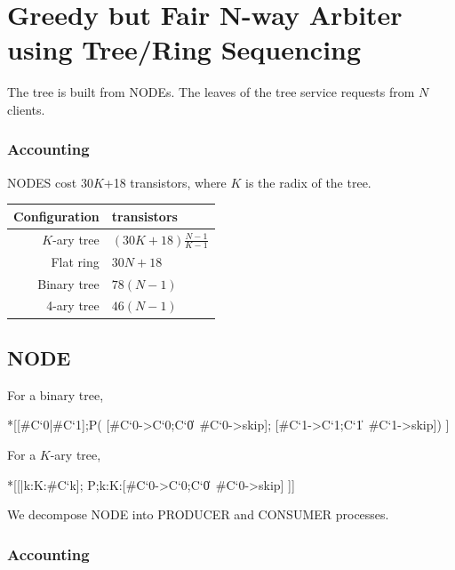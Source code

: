 \documentclass[aer.tex]{subfiles}
\begin{document}
\section{Greedy but Fair N-way Arbiter using Tree/Ring Sequencing}

The tree is built from NODEs. 
The leaves of the tree service requests from $N$ clients.

\subsubsection*{Accounting}

NODES cost 30$K$+18 transistors, where $K$ is the radix of the tree.

\begin{center}
    \begin{tabular}{|r|l|}
    \hline
    Configuration & transistors \\ \hline
    $K$-ary tree & $(30K+18)\frac{N-1}{K-1}$ \\ \hline
    Flat ring & $30N+18$ \\ \hline
    Binary tree & $78(N-1)$ \\ \hline
    4-ary tree & $46(N-1)$ \\ \hline
    \end{tabular}
\end{center}

\subsection{NODE}

For a binary tree,

\begin{csp}
*[[#{C`0}|#{C`1}];P\*(
  [#{C`0}->C`0;C`0\|~#{C`0}->skip];
  [#{C`1}->C`1;C`1\|~#{C`1}->skip])
 ]
\end{csp}

\noindent
For a $K$-ary tree,

\begin{csp}
*[[\langle|k:K:#{C`k}\rangle];
  P\*\langle;k:K:[#{C`0}->C`0;C`0\|~#{C`0}->skip]\rangle
 ]]
\end{csp}

\noindent
We decompose NODE into PRODUCER and CONSUMER processes.

\subsubsection*{Accounting}
\end{document}
